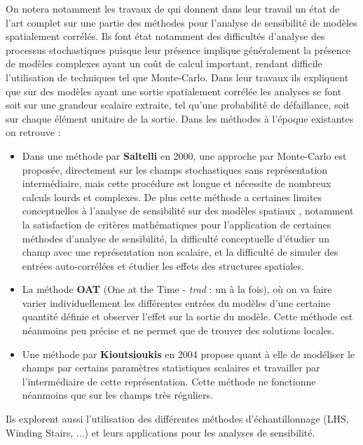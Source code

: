 \documentclass[a4paper,10pt]{article}
\begin{document}
On notera notamment les travaux de \cite{Lilburne2009Feb} qui donnent dans leur travail un état de l'art complet sur une partie des méthodes pour l'analyse de sensibilité de modèles spatialement corrélés. Ils font état notamment des difficultés d'analyse des processus stochastiques puisque leur présence implique généralement la présence de modèles complexes ayant un coût de calcul important,  rendant difficile l'utilisation de techniques tel que Monte-Carlo. Dans leur travaux ils expliquent que sur des modèles ayant une sortie spatialement corrélée les analyses se font soit sur une grandeur scalaire extraite, tel qu'une probabilité de défaillance, soit sur chaque élément unitaire de la sortie. Dans les méthodes à l'époque existantes on retrouve :
\begin{itemize}
\item Dans une méthode par \textbf{Saltelli} en 2000, une approche par Monte-Carlo est proposée, directement sur les champs stochastiques sans représentation intermédiaire, mais cette procédure est longue et nécessite de nombreux calculs lourds et complexes. De plus cette méthode a certaines limites conceptuelles à l'analyse de sensibilité sur des modèles spatiaux , notamment la satisfaction de critères mathématiques pour l'application de certaines méthodes d'analyse de sensibilité, la difficulté conceptuelle d'étudier un champ avec une représentation non scalaire, et la difficulté de simuler des entrées auto-corrélées et étudier les effets des structures spatiales. 

\item La méthode \textbf{OAT} (One at the Time - \textit{trad} : un à la fois), où on va faire varier individuellement les différentes entrées du modèles d'une certaine quantité définie et observer l'effet sur la sortie du modèle. Cette méthode est néanmoins peu précise et ne permet que de trouver des solutions locales.

\item Une méthode par \textbf{Kioutsioukis} en 2004 propose quant à elle de modéliser le champs par certains paramètres statistiques scalaires et travailler par l’intermédiaire de cette représentation. Cette méthode ne fonctionne néanmoins que sur les champs très réguliers. 
\end{itemize}

Ils explorent aussi l'utilisation des différentes méthodes d’échantillonnage (LHS, Winding Stairs, ...) et leurs applications pour les analyses de sensibilité. \par \smallskip
\end{document}
